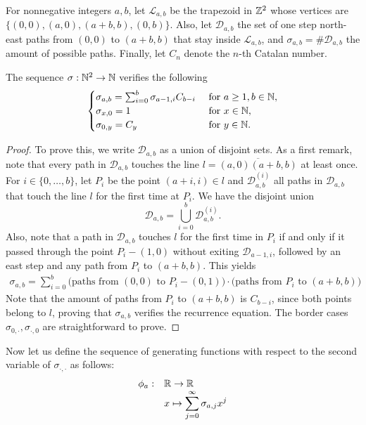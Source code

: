 For nonnegative integers $a,b$, let $\mathcal L_{a,b}$ be the trapezoid in $\mathbb{Z}^2$ whose vertices are
$\{(0,0),(a,0),(a+b,b),(0,b)\}.$ Also, let $\mathcal D_{a,b}$ the set of one step north-east paths from $(0,0)$ to $(a+b,b)$ that stay inside $\mathcal L_{a,b}$, and $\sigma_{a,b}=\# \mathcal D_{a,b}$ the amount of possible paths. Finally, let $C_n$ denote the $n$-th Catalan number. 
\begin{myprop*}
The sequence $\sigma:\mathbb{N}^2\to \mathbb{N}$ verifies the following
$$\begin{cases}
\sigma_{a,b}=\sum_{i=0}^b\sigma_{a-1,i}C_{b-i}& \mbox{ for }a\geq 1,b\in \mathbb{N},\\
\sigma_{x,0}=1 & \mbox{ for }x\in \mathbb{N},\\
\sigma_{0,y}=C_y & \mbox{ for }y\in \mathbb{N}.
\end{cases}$$
\end{myprop*}
\begin{proof}
To prove this, we write $\mathcal D_{a,b}$ as a union of disjoint sets. As a first remark, note that every path in $\mathcal D_{a,b}$ touches the line $l=\overline{(a,0)(a+b,b)}$ at least once. For $i\in \{0,\dots,b\}$, let $P_i$ be the point $(a+i,i)\in l$ and $\mathcal D_{a,b}^{(i)}$ all paths in $\mathcal D_{a,b}$ that touch the line $l$ for the first time at $P_i$. We have the disjoint union
$$\mathcal D_{a,b}=\bigcup_{i=0}^b \mathcal D_{a,b}^{(i)}.$$
Also, note that a path in $\mathcal D_{a,b}$ touches $l$ for the first time in $P_i$ if and only if it passed through the point $P_i-(1,0)$ without exiting $\mathcal D_{a-1,i}$, followed by an east step and any path from $P_i$ to $(a+b,b)$. This yields
\begin{eqnarray*}
\sigma_{a,b}=\sum_{i=0}^{b}\mbox{(paths from $(0,0)$ to $P_i-(0,1))$}\cdot \mbox{(paths from $P_i$ to $(a+b,b))$}
\end{eqnarray*}
Note that the amount of paths from $P_i$ to $(a+b,b)$ is $C_{b-i}$, since both points belong to $l$, proving that $\sigma_{a,b}$ verifies the recurrence equation. The border cases $\sigma_{0,\cdot},\sigma_{\cdot,0}$ are straightforward to prove.
\end{proof}

Now let us define the sequence of generating functions with respect to the second variable of $\sigma_{\cdot,\cdot}$ as follows:
$$\begin{array}{cl}
\phi_a:&\mathbb{R}\to \mathbb{R}\\
       &x\mapsto \displaystyle \sum_{j=0}^{\infty}\sigma_{a,j}x^j
\end{array}$$
 
